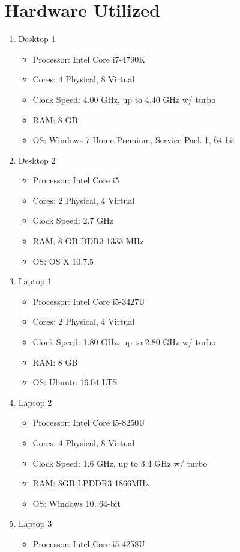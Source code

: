 \documentclass[journal]{IEEEtran}
\begin{document}
\section{Hardware Utilized}
\begin{enumerate}
\item{Desktop 1
	\begin{itemize}
	\item{Processor: Intel Core i7-4790K}
	\item{Cores: 4 Physical, 8 Virtual}
	\item{Clock Speed: 4.00 GHz, up to 4.40 GHz w/ turbo}
	\item{RAM: 8 GB}
	\item{OS: Windows 7 Home Premium, Service Pack 1, 64-bit}
	\end{itemize}
	}
\item{Desktop 2
	\begin{itemize}
	\item{Processor: Intel Core i5}
	\item{Cores: 2 Physical, 4 Virtual}
	\item{Clock Speed: 2.7 GHz}
	\item{RAM: 8 GB DDR3 1333 MHz}
	\item{OS: OS X 10.7.5}
	\end{itemize}
	}
\item{Laptop 1
	\begin{itemize}
	\item{Processor: Intel Core i5-3427U}
	\item{Cores: 2 Physical, 4 Virtual}
	\item{Clock Speed: 1.80 GHz, up to 2.80 GHz w/ turbo}
	\item{RAM: 8 GB}
	\item{OS: Ubuntu 16.04 LTS}
	\end{itemize}
	}
\item{Laptop 2
	\begin{itemize}
	\item{Processor: Intel Core i5-8250U}
	\item{Cores: 4 Physical, 8 Virtual}
	\item{Clock Speed: 1.6 GHz, up to 3.4 GHz w/ turbo}
	\item{RAM: 8GB LPDDR3 1866MHz}
	\item{OS: Windows 10, 64-bit}
	\end{itemize}
	}
\item{Laptop 3
	\begin{itemize}
	\item{Processor: Intel Core i5-4258U}

\end{itemize}}
\end{enumerate}
\end{document}
